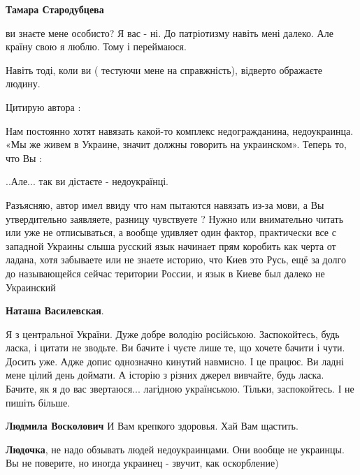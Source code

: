 \begin{itemize}
\begin{itemize}
\textbf{Тамара Стародубцева} 

ви знаєте мене особисто? Я вас - ні. До патріотизму навіть мені далеко. Але
країну свою я люблю. Тому і переймаюся.

Навіть тоді, коли ви ( тестуючи мене на справжність), відверто ображаєте
людину.


Цитирую автора :

Нам постоянно хотят навязать какой-то комплекс недогражданина, недоукраинца.
«Мы же живем в Украине, значит должны говорить на украинском». Теперь то, что
Вы :

..Але... так ви дістаєте - недоукраїнці.

Разъясняю, автор имел ввиду что нам пытаются навязать из-за мови, а Вы
утвердительно заявляете, разницу чувствуете ? Нужно или внимательно читать или
уже не отписываться, а вообще удивляет один фактор, практически все с западной
Украины слыша русский язык начинает прям коробить как черта от ладана, хотя
забываете или не знаете историю, что Киев это Русь, ещё за долго до
называющейся сейчас територии России, и язык в Киеве был далеко не Украинский

\textbf{Наташа Василевская}. 

Я з центральної України. Дуже добре володію російською. Заспокойтесь, будь
ласка, і цитати не зводьте. Ви бачите і чуєте лише те, що хочете бачити і чути.
Досить уже. Адже допис однозначно кинутий навмисно. І це працює. Ви ладні мене
цілий день доймати. А історію з різних джерел вивчайте, будь ласка. Бачите, як
я до вас звертаюся... лагідною українською. Тільки, заспокойтесь. І не пишіть
більше.


\textbf{Людмила Восколович} И Вам крепкого здоровья. Хай Вам щастить.


\textbf{Людочка}, не надо обзывать людей недоукраинцами. Они вообще не
украинцы. Вы не поверите, но иногда украинец - звучит, как оскорбление)


\end{itemize}
\end{itemize}
